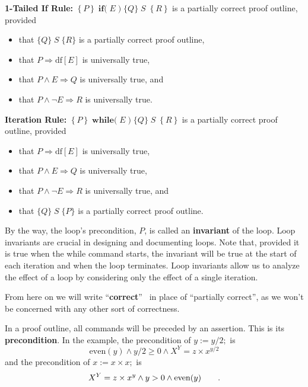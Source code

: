\documentclass[11pt]{article}%
\begin{document}
\textbf{1-Tailed If Rule:} $\left\{  P\right\}  \;\mathbf{if(}%
\;E\;)\;\{Q\}\;S\;\left\{  R\right\}  $ is a partially correct proof outline, provided

\begin{itemize}
\item that $\{Q\}\;S\;\{R\}$ is a partially correct proof outline,

\item that $P\Rightarrow\mathrm{df}[E]$ is universally true,

\item that $P\wedge E\Rightarrow Q$ is universally true, and

\item that $P\wedge\lnot E\Rightarrow R$ is universally true.
\end{itemize}

\textbf{Iteration Rule:} $\left\{  P\right\}  \;\mathbf{while(}%
\;E\;)\;\{Q\}\;S\;\left\{  R\right\}  $ is a partially correct proof outline, provided

\begin{itemize}
\item that $P\Rightarrow\mathrm{df}[E]$ is universally true,

\item that $P\wedge E\Rightarrow Q$ is universally true,

\item that $P\wedge\lnot E\Rightarrow R$ is universally true, and

\item that $\{Q\}\;S\;\{P\}$ is a partially correct proof outline.
\end{itemize}

By the way, the loop's precondition, $P$, is called an \textbf{invariant} of
the loop. Loop invariants are crucial in designing and documenting loops. Note
that, provided it is true when the while command starts, the invariant will be
true at the start of each iteration and when the loop terminates. Loop
invariants allow us to analyze the effect of a loop by considering only the
effect of a single iteration.

From here on we will write \textquotedblleft\textbf{correct}\textquotedblright%
\ in place of \textquotedblleft partially correct\textquotedblright, as we
won't be concerned with any other sort of correctness.

In a proof outline, all commands will be preceded by an assertion. This is its
\textbf{precondition}. In the example, the precondition of $y:=y/2;$ is
\[
\mathrm{even}(y)\wedge y/2\geq0\wedge X^{Y}=z\times x^{y/2}%
\]
and the precondition of $x:=x\times x;$ is%
\[
X^{Y}=z\times x^{y}\wedge y>0\wedge\mathrm{even}(y)\text{\qquad.}%
\]
\end{document}
